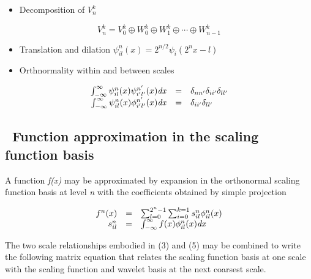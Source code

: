 \documentclass[letterpaper]{article}
\newcommand\liststyleLii{%
\renewcommand\labelitemi{${\bullet}$}
\renewcommand\labelitemii{${\circ}$}
\renewcommand\labelitemiii{${\blacksquare}$}
\renewcommand\labelitemiv{${\bullet}$}
}
\newcommand\liststyleLiii{%
\renewcommand\labelitemi{${\bullet}$}
\renewcommand\labelitemii{${\circ}$}
\renewcommand\labelitemiii{${\blacksquare}$}
\renewcommand\labelitemiv{${\bullet}$}
}
\begin{document}
\liststyleLii
\begin{itemize}
\item Decomposition of  $V_{n}^{k}$
\end{itemize}
\begin{equation}\label{seq:refText5}
V_{n}^{k}=V_{0}^{k}\oplus W_{0}^{k}\oplus W_{1}^{k}\oplus \cdots \oplus W_{n-1}^{k}
\end{equation}
\liststyleLiii
\begin{itemize}
\item Translation and dilation  $\psi _{il}^{n}(x)=2^{n/2}\psi _{i}(2^{n}x-l)$
\item Orthnormality within and between scales
\end{itemize}
\begin{equation}
\begin{matrix}\hfill \int _{-\infty }^{\infty }\psi _{il}^{n}(x)\psi _{i'l'}^{n'}(x)\mathit{dx}&\text{=}&\delta
_{nn'}\delta _{ii'}\delta _{ll'}\\\hfill \int _{-\infty }^{\infty }\psi _{il}^{n}(x)\phi
_{i'l'}^{n'}(x)\mathit{dx}&\text{=}&\delta _{ii'}\delta _{ll'}\hfill\null \end{matrix}
\end{equation}
\subsection[\ Function approximation in the scaling function basis]{\ Function approximation in the scaling function
basis}
A function \textit{f(x)} may be approximated by expansion in the orthonormal scaling function basis at level \textit{n
}with the coefficients obtained by simple projection

\begin{equation}\label{seq:refText7}
\begin{matrix}\hfill f^{n}(x)&\text{=}&\sum _{l=0}^{2^{n}-1}\sum _{i=0}^{k=1}s_{il}^{n}\phi _{il}^{n}(x)\hfill\null
\\\hfill s_{il}^{n}&\text{=}&\int _{-\infty }^{\infty }f(x)\phi _{il}^{n}(x)\mathit{dx}\hfill\null \end{matrix}
\end{equation}

\bigskip

The two scale relationships embodied in (3) and (5) may be combined to write the following matrix equation that relates
the scaling function basis at one scale with the scaling function and wavelet basis at the next coarsest scale.
\end{document}
